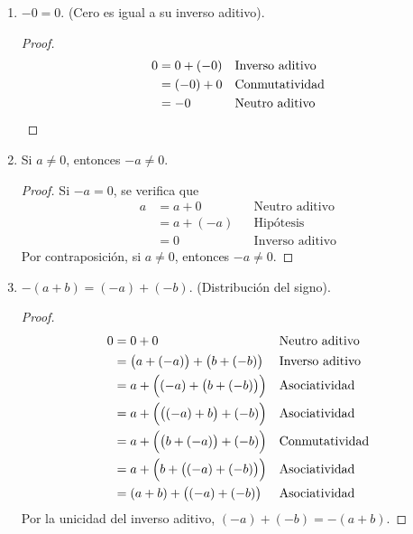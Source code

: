 \documentclass[11pt]{article}
\begin{document}
\begin{enumerate}[label=\alph*)]
 \item $-0 = 0$. (Cero es igual a su inverso aditivo).
 \begin{proof}
  \begin{align*}
   0 &= 0 + (-0) && \text{Inverso aditivo}\\
   &= (-0) + 0 && \text{Conmutatividad}\\
   &= -0 && \text{Neutro aditivo} \qedhere
  \end{align*}
 \end{proof}
%
 \item Si $a\neq 0$, entonces $-a\neq 0$.
 \begin{proof} 
  Si $-a=0$, se verifica que  \begin{align*}
   a &= a + 0 && \text{Neutro aditivo}\\
   &= a + (-a) && \text{Hipótesis}\\
   &= 0 && \text{Inverso aditivo}
  \end{align*} Por contraposición, si $a\neq 0$, entonces $-a\neq 0$.
 \end{proof}



 \item $-(a+b)=(-a)+(-b)$. (Distribución del signo).

 \begin{proof} 
  \begin{align*}
   0 &= 0 + 0 && \text{Neutro aditivo} \\
   &= \bigl(a+(-a)\bigr) + \bigl(b + (-b)\bigr) && \text{Inverso aditivo} \\
   &= a + \Bigl((-a)+ \bigl(b + (-b)\bigr)\Bigr) && \text{Asociatividad} \\
   &= a + \Bigl( \bigl((-a)+b\bigr) +(-b)\Bigr) && \text{Asociatividad} \\
   &= a + \Bigl( \bigl(b+(-a)\bigr) +(-b)\Bigr) && \text{Conmutatividad} \\
   &= a + \Bigl( b + \bigl( (-a)+(-b) \bigr) \Bigr) && \text{Asociatividad} \\
   &= (a+b) + \bigl((-a)+ (-b)\bigr) && \text{Asociatividad}
   \end{align*}
   Por la unicidad del inverso aditivo, $(-a)+ (-b)=-(a+b)$.  
 \end{proof}


\end{enumerate}
\end{document}

